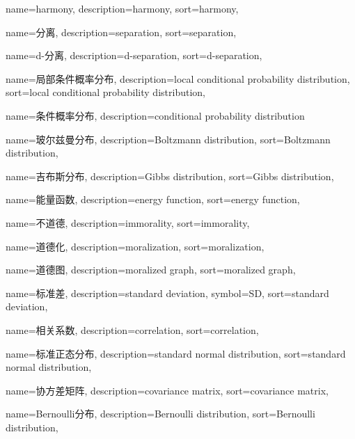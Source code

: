 {
  name=harmony,
  description={harmony},
  sort={harmony},
}

{
  name=分离,
  description={separation},
  sort={separation},
}

{
  name=d-分离,
  description={d-separation},
  sort={d-separation},
}

{
  name=局部条件概率分布,
  description={local conditional probability distribution},
  sort={local conditional probability distribution},
}

{
  name=条件概率分布,
  description={conditional probability distribution}
}

{
  name=玻尔兹曼分布,
  description={Boltzmann distribution},
  sort={Boltzmann distribution},
}

{
  name=吉布斯分布,
  description={Gibbs distribution},
  sort={Gibbs distribution},
}

{
  name=能量函数,
  description={energy function},
  sort={energy function},
}

{
  name=不道德,
  description={immorality},
  sort={immorality},
}

{
  name=道德化,
  description={moralization},
  sort={moralization},
}

{
  name=道德图,
  description={moralized graph},
  sort={moralized graph},
}

{
  name=标准差,
  description={standard deviation},
  symbol={SD},
  sort={standard deviation},
}

{
  name=相关系数,
  description={correlation},
  sort={correlation},
}

{
  name=标准正态分布,
  description={standard normal distribution},
  sort={standard normal distribution},
}

{
  name=协方差矩阵,
  description={covariance matrix},
  sort={covariance matrix},
}

{
  name=Bernoulli分布,
  description={Bernoulli distribution},
  sort={Bernoulli distribution},
}

